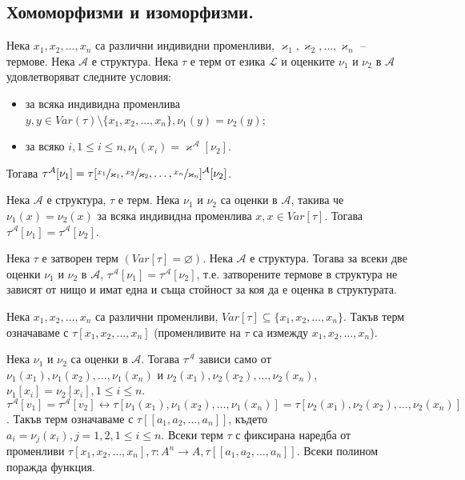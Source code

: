 \documentclass{article}
\begin{document}
\subsection*{Хомоморфизми и изоморфизми.}

\begin{claim}
Нека $x_1, x_2, \ldots, x_n$ са различни индивидни променливи, $\varkappa_1, \varkappa_2, \ldots, \varkappa_n$ -- термове. Нека $\mathcal{A}$ е структура. Нека $\tau$ е терм от езика $\mathcal{L}$ и оценките $\nu_1$ и $\nu_2$ в $\mathcal{A}$ удовлетворяват следните условия:
\begin{itemize}
\item за всяка индивидна променлива $y, y \in Var(\tau) \setminus \{x_1, x_2, \ldots, x_n\}, \nu_1(y) = \nu_2(y)$;
\item за всяко $i, 1 \leq i \leq n, \nu_1(x_i) = \varkappa^\mathcal{A}[\nu_2]$.
\end{itemize}

Тогава $\tau^\mathcal{A}[\nu_1] = \tau[\sfrac{x_1}{\varkappa_1}, \sfrac{x_2}{\varkappa_2}, \ldots, \sfrac{x_n}{\varkappa_n}]^\mathcal{A}[\nu_2]$.

\setcounter{conseq}{0}
\begin{conseq}
Нека $\mathcal{A}$ е структура, $\tau$ е терм. Нека $\nu_1$ и $\nu_2$ са оценки в $\mathcal{A}$, такива че $\nu_1(x) = \nu_2(x)$ за всяка индивидна променлива $x, x \in Var[\tau]$. Тогава $\tau^\mathcal{A}[\nu_1] = \tau^\mathcal{A}[\nu_2]$.

\begin{conseq}
Нека $\tau$ е затворен терм $(Var[\tau] = \varnothing)$. Нека $\mathcal{A}$ е структура. Тогава за всеки две оценки $\nu_1$ и $\nu_2$ в $\mathcal{A}$, $\tau^\mathcal{A}[\nu_1] = \tau^\mathcal{A}[\nu_2]$, т.е. затворените термове в структура не зависят от нищо и имат една и съща стойност за коя да е оценка в структурата.
\par Нека $x_1, x_2, \ldots, x_n$ са различни променливи, $Var[\tau] \subseteq \{ x_1, x_2, \ldots, x_n \}$. Такъв терм означаваме с $\tau[x_1,x_2, \ldots, x_n]$ (променливите на $\tau$ са измежду $x_1, x_2, \ldots, x_n$).
\par Нека $\nu_1$ и $\nu_2$ са оценки в $\mathcal{A}$. Тогава $\tau^\mathcal{A}$ зависи само от $\nu_1(x_1), \nu_1(x_2), \ldots, \nu_1(x_n)$ и $\nu_2(x_1), \nu_2(x_2), \ldots, \nu_2(x_n)$, $\nu_1[x_i] = \nu_2[x_i], 1 \leq i \leq n$. $\tau^\mathcal{A}[v_1] = \tau^\mathcal{A}[v_2] \longleftrightarrow \tau[\nu_1(x_1), \nu_1(x_2), \ldots, \nu_1(x_n)] = \tau[\nu_2(x_1), \nu_2(x_2), \ldots, \nu_2(x_n)]$. Такъв терм означаваме с $\tau[\![a_1, a_2, \ldots, a_n]\!]$, където $a_i = \nu_j(x_i), j = 1,2, 1 \leq i \leq n$. Всеки терм $\tau$ с фиксирана наредба от променливи $\tau[x_1, x_2, \ldots, x_n], \tau : A^n \longrightarrow A, \tau[\![a_1, a_2, \ldots, a_n]\!]$. Всеки полином поражда функция.
\end{conseq}

\end{conseq}

\end{claim}
\end{document}
